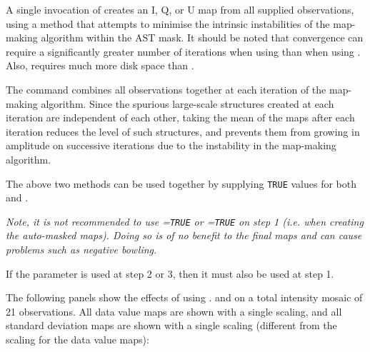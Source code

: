 \begin{enumerate}
A single invocation of  creates an I, Q, or U map from all
supplied observations, using a method that attempts to minimise the
intrinsic instabilities of the map-making algorithm within the AST mask.
It should be noted that convergence can require a significantly greater number
of iterations when using  than when using . Also,
 requires much more disk space than .

The  command combines all observations together at each
iteration of the map-making algorithm. Since the spurious large-scale
structures created at each iteration are independent of each other,
taking the mean of the maps after each iteration reduces the level of such
structures, and prevents them from growing in amplitude on successive
iterations due to the instability in the map-making algorithm.

\end{enumerate}

The above two methods can be used together by supplying \texttt{TRUE}
values for both  and .

\begin{center}
\emph{Note, it is not recommended to use =\texttt{TRUE} or
=\texttt{TRUE} on step 1 (i.e. when creating the auto-masked
maps). Doing so is of no benefit to the final maps and can cause problems
such as negative bowling.}
\end{center}

If the  parameter is used at step 2 or 3, then it must
also be used at step 1.

The following panels show the effects of using . and
 on a total intensity mosaic of 21 observations. All
data value maps are shown with a single scaling, and all standard
deviation maps are shown with a single scaling (different from the scaling
for the data value maps):

\newlength{\picwid}
\latexhtml{\setlength{\picwid}{0.3\linewidth}}{\setlength{\picwid}{0.9\linewidth}}

